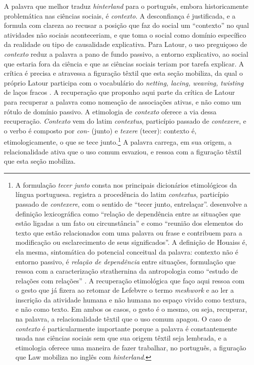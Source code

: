 A palavra que melhor traduz \textit{hinterland} para o português, embora historicamente problemática nas ciências sociais, é \textit{contexto}. A desconfiança é justificada, e \textcite{Latour2012Reagregando} a formula com clareza ao recusar a posição que faz do social um \enquote{contexto} no qual atividades não sociais aconteceriam, e que toma o social como domínio específico da realidade ou tipo de causalidade explicativa. Para Latour, o uso preguiçoso de \textit{contexto} reduz a palavra a pano de fundo passivo, a entorno explicativo, ao social que estaria fora da ciência e que as ciências sociais teriam por tarefa explicar. A crítica é precisa e atravessa a figuração têxtil que esta seção mobiliza, da qual o próprio Latour participa com o vocabulário do \textit{netting, lacing, weaving, twisting} de laços fracos \parencite[p.~3]{latour1996clarifications}. A recuperação que proponho aqui parte da crítica de Latour para recuperar a palavra como nomeação de associações ativas, e não como um rótulo de domínio passivo. A etimologia de \textit{contexto} oferece a via dessa recuperação. \textit{Contexto} vem do latim \textit{contextus}, particípio passado de \textit{contexere}, e o verbo é composto por \textit{con-} (junto) e \textit{texere} (tecer): contexto é, etimologicamente, o que se tece junto.\footnote{A formulação \textit{tecer junto} consta nos principais dicionários etimológicos da língua portuguesa. \textcite[verbete \enquote{contexto}]{Cunha2010Etimologico} registra a procedência do latim \textit{contextus}, particípio passado de \textit{contexere}, com o sentido de \enquote{tecer junto, entrelaçar}. \textcite[verbete \enquote{contexto}]{Houaiss2014Dicionario} desenvolve a definição lexicográfica como \enquote{relação de dependência entre as situações que estão ligadas a um fato ou circunstância} e como \enquote{reunião dos elementos do texto que estão relacionados com uma palavra ou frase e contribuem para a modificação ou esclarecimento de seus significados}. A definição de Houaiss é, ela mesma, sintomática do potencial conceitual da palavra: contexto não é entorno passivo, é \textit{relação de dependência} entre situações, formulação que ressoa com a caracterização strathernina da antropologia como \enquote{estudo de relações com relações} \parencite[p.~33]{Haraway2016Staying}. A recuperação etimológica que faço aqui ressoa com o gesto que \textcite{Ingold2011BeingAlive} já fizera ao retomar de Lefebvre o termo \textit{meshwork} e ao ler a inscrição da atividade humana e não humana no espaço vivido como textura, e não como texto. Em ambos os casos, o gesto é o mesmo, ou seja, recuperar, na palavra, a relacionalidade têxtil que o uso comum apagou. O caso de \textit{contexto} é particularmente importante porque a palavra é constantemente usada nas ciências sociais sem que sua origem têxtil seja lembrada, e a etimologia oferece uma maneira de fazer trabalhar, no português, a figuração que Law mobiliza no inglês com \textit{hinterland}.} A palavra carrega, em sua origem, a relacionalidade ativa que o uso comum esvaziou, e ressoa com a figuração têxtil que esta seção mobiliza.
